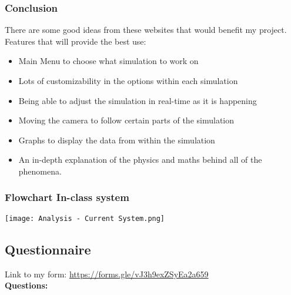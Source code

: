 \documentclass[12pt]{article}
\begin{document}
\subsubsection{Conclusion}
There are some good ideas from these websites that would benefit my project. \\
Features that will provide the best use:
\begin{itemize}
\setlength\itemsep{-0.25em}
    \item Main Menu to choose what simulation to work on
    \item Lots of customizability in the options within each simulation
    \item Being able to adjust the simulation in real-time as it is happening
    \item Moving the camera to follow certain parts of the simulation
    \item Graphs to display the data from within the simulation
    \item An in-depth explanation of the physics and maths behind all of the phenomena.
\end{itemize}














\newpage
\subsubsection{Flowchart In-class system}
\begin{center}
    \texttt{[image: Analysis - Current System.png]} 
\end{center}
















\newpage
\subsection{Questionnaire}
Link to my form: \href{https://forms.gle/vJ3h9exZSyEa2a659}{https://forms.gle/vJ3h9exZSyEa2a659}
\\

\textbf{Questions:}
\end{document}
